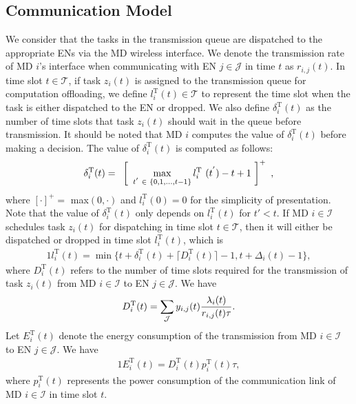 \documentclass[10pt, journal,letterpaper]{IEEEtran}
\begin{document}
\subsection{Communication Model}
 We consider that the tasks in the transmission queue are dispatched to the appropriate ENs via the MD wireless interface. We denote the transmission rate of MD $i$'s interface when communicating with EN $j \in \mathcal{J}$ in time $t$ as $r_{i,j}(t)$. In time slot $t \in \mathcal{T}$, if task $z_i(t)$ is assigned to the transmission queue for computation offloading, we define $l_i^{\text{T}}(t) \in \mathcal{T}$ to represent the time slot when the task is either dispatched to the EN or dropped. We also define $\delta_i^{\text{T}}(t)$ as the number of time slots that task $z_i(t)$ should wait in the queue before transmission. It should be noted that MD $i$ computes the value of $\delta_i^{\text{T}}(t)$ before making a decision. The value of $\delta_i^{\text{T}}(t)$ is computed as follows:
\begin{alignat}{1}
	\delta_i^{\text{T}}(t) =\textcolor{white}{i} \left[ \textcolor{white}{i}\max\limits_{t^{'}\textcolor{white}{i} \in \textcolor{white}{i} \{0,1,\ldots,t-1\}} l_i^{\text{T}}\textcolor{white}{i}(t^{'})-t+1\textcolor{white}{i}\right]^+\textcolor{white}{i},
	\label{1}  
\end{alignat}
where $[\cdot]^+ =$ max$(0, \cdot)$ and $l_i^{\text{T}}(0)=0$ for the simplicity of presentation. Note that the value of $\delta_i^{\text{T}}(t)$ only depends on $l_i^{\text{T}}(t)$ for $t' < t$. If MD $i \in \mathcal{I}$ schedules task $z_i(t)$ for dispatching in time slot $t \in \mathcal{T}$, then it will either be dispatched or dropped in time slot $l_i^{\text{T}}(t)$, which is
\begin{alignat}{1}
	l_i^{\text{T}}(t) = \min \Big\{t + \delta_i^{\text{T}}(t) + \lceil{D_i^{\text{T}}(t)}\rceil - 1, t + \Delta_i(t) - 1\Big\},
	\label{2}  
\end{alignat}
where $D_i^{\text{T}}(t)$ refers to the number of time slots required for the transmission of task $z_i(t)$ from MD $i \in \mathcal{I}$ to EN $j \in \mathcal{J}$. We have
\begin{alignat}{1}
	D_i^{\text{T}}(t) =  \sum_{\mathcal{J}} y_{i,j}(t) {\lambda_i(t) \over r_{i,j}(t)\tau}.
	\label{3}  
\end{alignat}
Let $E_i^{\text{T}}(t)$ denote the energy consumption of the transmission from MD $i \in \mathcal{I}$ to EN $j \in \mathcal{J}$. We have
\begin{alignat}{1}
	E_i^{\text{T}}(t) = D_i^{\text{T}}(t)p_i^{\text{T}}(t)\tau,
	\label{4}  
\end{alignat}
where $p_i^{\text{T}}(t)$ represents the power consumption of the communication link of MD $i \in \mathcal{I}$ in time slot $t$.
\end{document}
